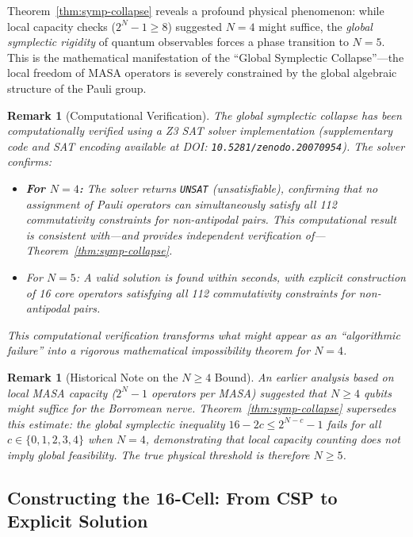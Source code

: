 \documentclass[11pt]{article}
\newtheorem{remark}[theorem]{Remark}
\begin{document}
Theorem~\ref{thm:symp-collapse} reveals a profound physical phenomenon: while local capacity checks ($2^N - 1 \geq 8$) suggested $N=4$ might suffice, the \emph{global symplectic rigidity} of quantum observables forces a phase transition to $N=5$. This is the mathematical manifestation of the ``Global Symplectic Collapse''---the local freedom of MASA operators is severely constrained by the global algebraic structure of the Pauli group.

\begin{remark}[Computational Verification]
The global symplectic collapse has been computationally verified using a Z3 SAT solver implementation (supplementary code and SAT encoding available at DOI: \texttt{10.5281/zenodo.20070954}). The solver confirms:
\begin{itemize}
    \item \textbf{For $N=4$:} The solver returns \texttt{UNSAT} (unsatisfiable), confirming that no assignment of Pauli operators can simultaneously satisfy all 112 commutativity constraints for non-antipodal pairs. This computational result is consistent with---and provides independent verification of---Theorem~\ref{thm:symp-collapse}.
    \item For $N=5$: A valid solution is found within seconds, with explicit construction of 16 core operators satisfying all 112 commutativity constraints for non-antipodal pairs.
\end{itemize}
This computational verification transforms what might appear as an ``algorithmic failure'' into a rigorous mathematical impossibility theorem for $N=4$.
\end{remark}

\begin{remark}[Historical Note on the $N \geq 4$ Bound]
An earlier analysis based on local MASA capacity ($2^N - 1$ operators per MASA) suggested that $N \geq 4$ qubits might suffice for the Borromean nerve. Theorem~\ref{thm:symp-collapse} supersedes this estimate: the global symplectic inequality $16 - 2c \leq 2^{N-c} - 1$ fails for all $c \in \{0,1,2,3,4\}$ when $N = 4$, demonstrating that local capacity counting does not imply global feasibility. The true physical threshold is therefore $N \geq 5$.
\end{remark}

\subsection{Constructing the 16-Cell: From CSP to Explicit Solution}
\end{document}

